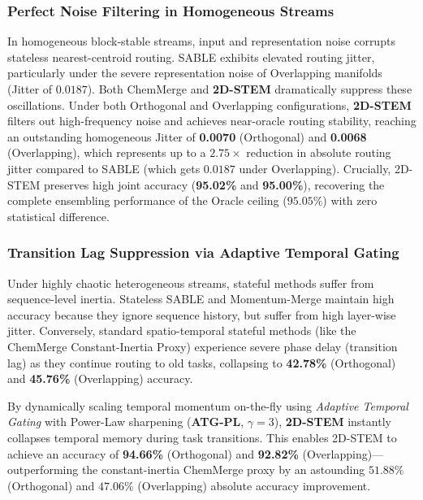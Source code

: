 \subsubsection{Perfect Noise Filtering in Homogeneous Streams}
In homogeneous block-stable streams, input and representation noise corrupts stateless nearest-centroid routing. SABLE exhibits elevated routing jitter, particularly under the severe representation noise of Overlapping manifolds (Jitter of $0.0187$). Both ChemMerge and \textbf{2D-STEM} dramatically suppress these oscillations. Under both Orthogonal and Overlapping configurations, \textbf{2D-STEM} filters out high-frequency noise and achieves near-oracle routing stability, reaching an outstanding homogeneous Jitter of \textbf{0.0070} (Orthogonal) and \textbf{0.0068} (Overlapping), which represents up to a \textbf{$2.75\times$} reduction in absolute routing jitter compared to SABLE (which gets $0.0187$ under Overlapping). Crucially, 2D-STEM preserves high joint accuracy (\textbf{95.02\%} and \textbf{95.00\%}), recovering the complete ensembling performance of the Oracle ceiling ($95.05\%$) with zero statistical difference.

\subsubsection{Transition Lag Suppression via Adaptive Temporal Gating}
Under highly chaotic heterogeneous streams, stateful methods suffer from sequence-level inertia. Stateless SABLE and Momentum-Merge maintain high accuracy because they ignore sequence history, but suffer from high layer-wise jitter. Conversely, standard spatio-temporal stateful methods (like the ChemMerge Constant-Inertia Proxy) experience severe phase delay (transition lag) as they continue routing to old tasks, collapsing to \textbf{42.78\%} (Orthogonal) and \textbf{45.76\%} (Overlapping) accuracy.

By dynamically scaling temporal momentum on-the-fly using \emph{Adaptive Temporal Gating} with Power-Law sharpening (\textbf{ATG-PL}, $\gamma=3$), \textbf{2D-STEM} instantly collapses temporal memory during task transitions. This enables 2D-STEM to achieve an accuracy of \textbf{94.66\%} (Orthogonal) and \textbf{92.82\%} (Overlapping)---outperforming the constant-inertia ChemMerge proxy by an astounding \textbf{$51.88\%$} (Orthogonal) and \textbf{$47.06\%$} (Overlapping) absolute accuracy improvement.

